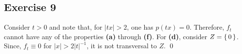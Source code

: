 \documentclass{article}
\begin{document}
  \subsection*{Exercise 9}
    Consider $t>0$ and note that, for $|tx|>2$, one has $p(tx)=0$. Therefore,
    $f_t$ cannot have any of the properties \textbf{(a)} through \textbf{(f)}.
    For \textbf{(d)}, consider $Z=\set{0}$. Since, $f_t\equiv0$ for
    $|x|>2|t|^{-1}$, it is not transversal to $Z$.
    \qed
\end{document}

